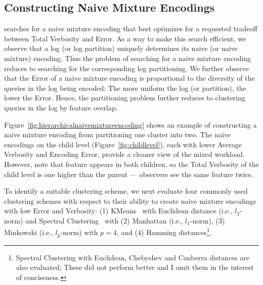 \subsection{Constructing Naive Mixture Encodings}
\label{sec:constructingnaivemixtureencodings}
\systemnameone searches for a naive mixture encoding that best optimizes for a requested tradeoff between Total Verbosity and Error.  
As a way to make this search efficient, we observe that a log (or log partition) uniquely determines its naive (or naive mixture) encoding. 
Thus the problem of searching for a naive mixture encoding reduces to searching for the corresponding log partitioning.
We further observe that the Error of a naive mixture encoding is proportional to the diversity of the queries in the log being encoded: 
The more uniform the log (or partition), the lower the Error.
Hence, the partitioning problem further reduces to clustering queries in the log by feature overlap.
 \begin{example}
 \label{example:twolevelnaivemixtureencoding}
 Figure~\ref{fig:hierarchicalnaivemixtureencoding} shows an example of constructing a naive mixture encoding from partitioning one cluster into two.
 The naive encodings on the child level (Figure~\ref{fig:childlevel}), each with lower Average Verbosity and Encoding Error, provide a cleaner view of the mixed workload.
 However, note that feature  appears in both children, so the Total Verbosity of the child level is one higher than the parent --- observers see the same feature twice.
 \end{example}
To identify a suitable clustering scheme, we next evaluate four commonly used clustering schemes with respect to their ability to create naive mixture encodings with low Error and Verbosity: (1) KMeans~\cite{DBLP:journals/prl/Jain10} with Euclidean distance (i.e., $l_2$-norm) and Spectral Clustering~\cite{DBLP:journals/jacm/KannanVV04} with (2) Manhattan (i.e., $l_1$-norm), (3) Minkowski (i.e., $l_p$-norm) with $p=4$, and (4) Hamming distances\footnote{Spectral Clustering with Euclidean, Chebyshev and Canberra distances are also evaluated; These did not perform better and I omit them in the interest of conciseness.}.
